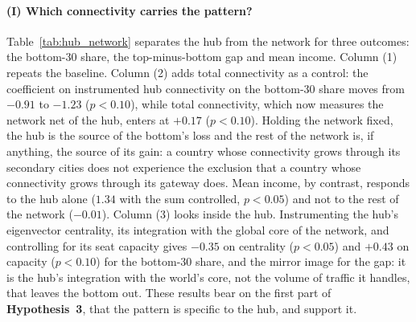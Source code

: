 \paragraph{(I) Which connectivity carries the pattern?}
Table~\ref{tab:hub_network} separates the hub from the network for three outcomes: the bottom-30 share, the top-minus-bottom gap and mean income. Column (1) repeats the baseline. Column (2) adds total connectivity as a control: the coefficient on instrumented hub connectivity on the bottom-30 share moves from $-0.91$ to $-1.23$ ($p<0.10$), while total connectivity, which now measures the network net of the hub, enters at $+0.17$ ($p<0.10$). Holding the network fixed, the hub is the source of the bottom's loss and the rest of the network is, if anything, the source of its gain: a country whose connectivity grows through its secondary cities does not experience the exclusion that a country whose connectivity grows through its gateway does. Mean income, by contrast, responds to the hub alone ($1.34$ with the sum controlled, $p<0.05$) and not to the rest of the network ($-0.01$). Column (3) looks inside the hub. Instrumenting the hub's eigenvector centrality, its integration with the global core of the network, and controlling for its seat capacity gives $-0.35$ on centrality ($p<0.05$) and $+0.43$ on capacity ($p<0.10$) for the bottom-30 share, and the mirror image for the gap: it is the hub's integration with the world's core, not the volume of traffic it handles, that leaves the bottom out. These results bear on the first part of \textbf{Hypothesis~3}, that the pattern is specific to the hub, and support it.

